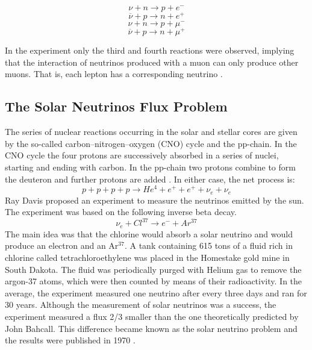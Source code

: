 %
\begin{equation}
	\nu + n \longrightarrow p + e^-
	\label{lss_primeira}
\end{equation}
\vspace{-0.85cm}
%
\begin{equation}
	\overline{\nu} + p \longrightarrow n + e^+
	\label{lss_segunda}
\end{equation}
%
\begin{equation}
	\nu + n \longrightarrow p + \mu^-
	\label{lss_terceira}
\end{equation}
\begin{equation}
	\overline{\nu} + p \longrightarrow n + \mu^+
	\label{lss_quarta}
\end{equation}
%

In the experiment only the third and fourth reactions were observed, implying that the interaction of neutrinos produced with a muon can only produce other muons. That is, each lepton has a corresponding neutrino \cite{two_neutrinos}.

\subsection{The Solar Neutrinos Flux Problem}

The series of nuclear reactions occurring in the solar and stellar cores are given by the so-called carbon–nitrogen–oxygen (CNO) cycle and the pp-chain. In the CNO cycle the four protons are successively absorbed in a series of nuclei, starting and ending with carbon. In the pp-chain two protons combine to form the deuteron and further protons are added \cite{the_story_of_the_neutrino}. In either case, the net process is:
%
\begin{equation}
	p+p+p+p \longrightarrow He^4 +e^+ + e^+ +\nu_e +\nu_e
	\label{solar_reaction}
\end{equation}
%
Ray Davis proposed an experiment to measure the neutrinos emitted by the sun. The experiment was based on the following inverse beta decay.
%
\begin{equation}
		\nu_e + Cl^{37} \longrightarrow e^- +Ar^{37}
		\label{solar_reaction}
\end{equation}
%
The main idea was that the chlorine would absorb a solar neutrino and would produce an electron and an Ar$^{37}$. A tank containing 615 tons of a fluid rich in chlorine called tetrachloroethylene was placed in the Homestake gold mine in South Dakota. The fluid was periodically purged with Helium gas to remove the argon-37 atoms, which were then counted by means of their radioactivity. In the average, the experiment measured one neutrino after every three days and ran for 30 years. Although the measurement of solar neutrinos was a success, the experiment measured a flux 2/3 smaller than the one theoretically predicted by John Bahcall. This difference became known as the solar neutrino problem and the results were published in 1970 \cite{the_story_of_the_neutrino}.


